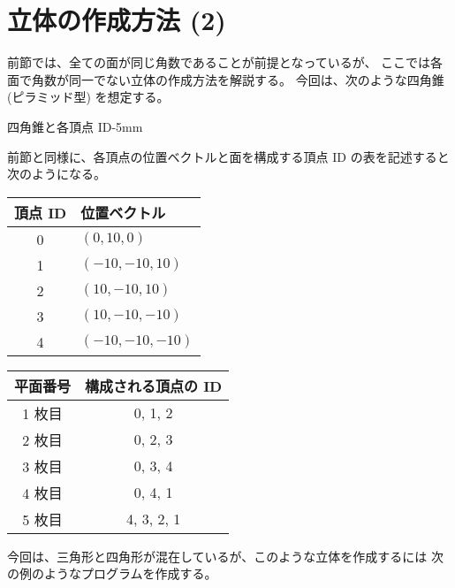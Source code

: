 \section{立体の作成方法 (2)} \label{sec:solidGen2}
前節では、全ての面が同じ角数であることが前提となっているが、
ここでは各面で角数が同一でない立体の作成方法を解説する。
今回は、次のような四角錐 (ピラミッド型) を想定する。

	{四角錐と各頂点 ID}{-5mm}

前節と同様に、各頂点の位置ベクトルと面を構成する頂点 ID の表を記述すると
次のようになる。
\begin{center}
\begin{tabular}{|c|l|}
\hline
頂点 ID & 位置ベクトル \\ \hline
0 & \((0, 10, 0)\) \\ \hline
1 & \((-10, -10, 10)\) \\ \hline
2 & \((10, -10, 10)\) \\ \hline
3 & \((10, -10, -10)\) \\ \hline
4 & \((-10, -10, -10)\) \\ \hline
\end{tabular} \qquad
\begin{tabular}{|c|c|}
\hline
平面番号 & 構成される頂点の ID \\ \hline
1 枚目 & 0, 1, 2 \\ \hline
2 枚目 & 0, 2, 3 \\ \hline
3 枚目 & 0, 3, 4 \\ \hline
4 枚目 & 0, 4, 1 \\ \hline
5 枚目 & 4, 3, 2, 1 \\ \hline
\end{tabular}
\end{center}
今回は、三角形と四角形が混在しているが、このような立体を作成するには
次の例のようなプログラムを作成する。
\\
